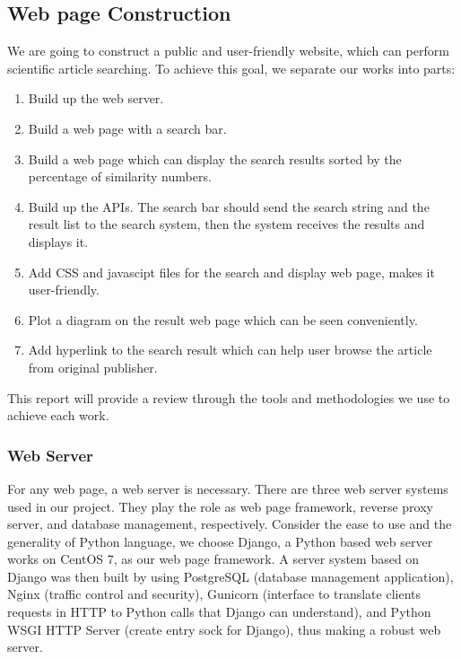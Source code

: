 \subsection{Web page Construction}

We are going to construct a public and user-friendly website, which can perform scientific article searching.
To achieve this goal, we separate our works into parts:\\
\begin{enumerate}
	\item Build up the web server.	
	\item Build a web page with a search bar.
	\item Build a web page which can display the search results sorted by the percentage of similarity numbers.
	\item Build up the APIs. The search bar should send the search string and the result list to the search system, 
	then the system receives the results and displays it.
	\item Add CSS and javascipt files for the search and display web page, makes it user-friendly.
	\item Plot a diagram on the result web page which can be seen conveniently.
	\item Add hyperlink to the search result which can help user browse the article from original publisher.
\end{enumerate}
This report will provide a review through the tools and methodologies we use to achieve each work.
\subsubsection{Web Server}
For any web page, a web server is necessary.
There are three web server systems used in our project. 
They play the role as web page framework, reverse proxy server, and database management, respectively. 
Consider the ease to use and the generality of Python language, we choose Django, a Python based web server works on CentOS 7, as our web page framework. 
A server system based on Django was then built by using PostgreSQL (database management application), 
Nginx (traffic control and security), Gunicorn (interface to translate clients requests in HTTP to Python calls that Django can understand), and Python WSGI HTTP 
Server (create entry sock for Django), thus making a robust web server.

